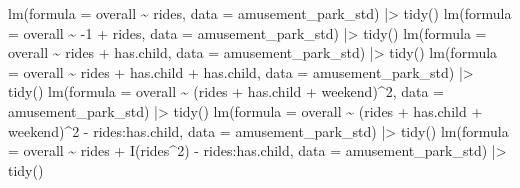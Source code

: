 \documentclass[
  ignorenonframetext,
]{beamer}
\newenvironment{Shaded}{\begin{snugshade}}{\end{snugshade}}
\newcommand{\AttributeTok}[1]{\textcolor[rgb]{0.40,0.45,0.13}{#1}}
\newcommand{\DecValTok}[1]{\textcolor[rgb]{0.68,0.00,0.00}{#1}}
\newcommand{\FunctionTok}[1]{\textcolor[rgb]{0.28,0.35,0.67}{#1}}
\newcommand{\NormalTok}[1]{\textcolor[rgb]{0.00,0.23,0.31}{#1}}
\newcommand{\SpecialCharTok}[1]{\textcolor[rgb]{0.37,0.37,0.37}{#1}}
\begin{document}
\begin{frame}[fragile]{}
\begin{Shaded}
\begin{Highlighting}[]
\FunctionTok{lm}\NormalTok{(}\AttributeTok{formula =}\NormalTok{ overall }\SpecialCharTok{\textasciitilde{}}\NormalTok{ rides, }\AttributeTok{data =}\NormalTok{ amusement\_park\_std) }\SpecialCharTok{|\textgreater{}} \FunctionTok{tidy}\NormalTok{()}
\FunctionTok{lm}\NormalTok{(}\AttributeTok{formula =}\NormalTok{ overall }\SpecialCharTok{\textasciitilde{}} \SpecialCharTok{{-}}\DecValTok{1} \SpecialCharTok{+}\NormalTok{ rides, }\AttributeTok{data =}\NormalTok{ amusement\_park\_std) }\SpecialCharTok{|\textgreater{}} \FunctionTok{tidy}\NormalTok{()}
\FunctionTok{lm}\NormalTok{(}\AttributeTok{formula =}\NormalTok{ overall }\SpecialCharTok{\textasciitilde{}}\NormalTok{ rides }\SpecialCharTok{+}\NormalTok{ has.child, }\AttributeTok{data =}\NormalTok{ amusement\_park\_std) }\SpecialCharTok{|\textgreater{}} \FunctionTok{tidy}\NormalTok{()}
\FunctionTok{lm}\NormalTok{(}\AttributeTok{formula =}\NormalTok{ overall }\SpecialCharTok{\textasciitilde{}}\NormalTok{ rides }\SpecialCharTok{+}\NormalTok{ has.child }\SpecialCharTok{+}\NormalTok{ has.child, }\AttributeTok{data =}\NormalTok{ amusement\_park\_std) }\SpecialCharTok{|\textgreater{}} \FunctionTok{tidy}\NormalTok{()}
\FunctionTok{lm}\NormalTok{(}\AttributeTok{formula =}\NormalTok{ overall }\SpecialCharTok{\textasciitilde{}}\NormalTok{ (rides }\SpecialCharTok{+}\NormalTok{ has.child }\SpecialCharTok{+}\NormalTok{ weekend)}\SpecialCharTok{\^{}}\DecValTok{2}\NormalTok{, }
   \AttributeTok{data =}\NormalTok{ amusement\_park\_std) }\SpecialCharTok{|\textgreater{}} \FunctionTok{tidy}\NormalTok{()}
\FunctionTok{lm}\NormalTok{(}\AttributeTok{formula =}\NormalTok{ overall }\SpecialCharTok{\textasciitilde{}}\NormalTok{ (rides }\SpecialCharTok{+}\NormalTok{ has.child }\SpecialCharTok{+}\NormalTok{ weekend)}\SpecialCharTok{\^{}}\DecValTok{2} \SpecialCharTok{{-}}\NormalTok{ rides}\SpecialCharTok{:}\NormalTok{has.child, }
   \AttributeTok{data =}\NormalTok{ amusement\_park\_std) }\SpecialCharTok{|\textgreater{}} \FunctionTok{tidy}\NormalTok{()}
\FunctionTok{lm}\NormalTok{(}\AttributeTok{formula =}\NormalTok{ overall }\SpecialCharTok{\textasciitilde{}}\NormalTok{ rides }\SpecialCharTok{+} \FunctionTok{I}\NormalTok{(rides}\SpecialCharTok{\^{}}\DecValTok{2}\NormalTok{) }\SpecialCharTok{{-}}\NormalTok{ rides}\SpecialCharTok{:}\NormalTok{has.child, }\AttributeTok{data =}\NormalTok{ amusement\_park\_std) }\SpecialCharTok{|\textgreater{}} \FunctionTok{tidy}\NormalTok{()}
\end{Highlighting}
\end{Shaded}
\end{frame}
\end{document}

